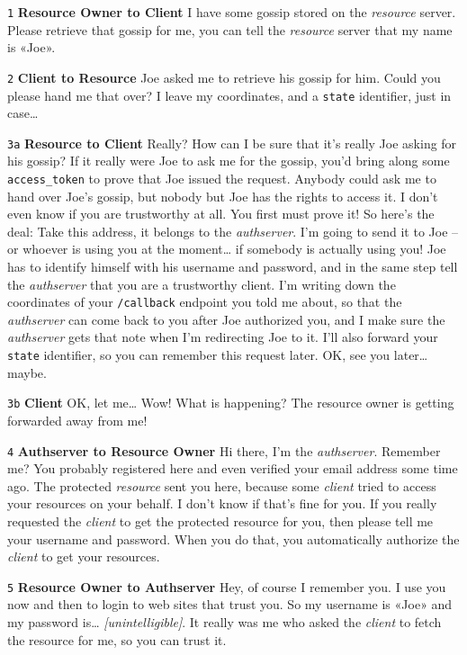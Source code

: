 \begin{description}
    \item \texttt{1} \textbf{Resource Owner to Client} I have some gossip stored on the \textit{resource} server. Please retrieve that gossip for me, you can tell the \textit{resource} server that my name is «Joe».
    \item \texttt{2} \textbf{Client to Resource} Joe asked me to retrieve his gossip for him. Could you please hand me that over? I leave my coordinates, and a \texttt{state} identifier, just in case…
    \item \texttt{3a} \textbf{Resource to Client} Really? How can I be sure that it's really Joe asking for his gossip? If it really were Joe to ask me for the gossip, you'd bring along some \texttt{access\_token} to prove that Joe issued the request. Anybody could ask me to hand over Joe's gossip, but nobody but Joe has the rights to access it. I don't even know if you are trustworthy at all. You first must prove it! So here's the deal: Take this address, it belongs to the \textit{authserver}. I'm going to send it to Joe -- or whoever is using you at the moment… if somebody is actually using you! Joe has to identify himself with his username and password, and in the same step tell the \textit{authserver} that you are a trustworthy client. I'm writing down the coordinates of your \texttt{/callback} endpoint you told me about, so that the \textit{authserver} can come back to you after Joe authorized you, and I make sure the \textit{authserver} gets that note when I'm redirecting Joe to it. I'll also forward your \texttt{state} identifier, so you can remember this request later. OK, see you later… maybe.
    \item \texttt{3b} \textbf{Client} OK, let me… Wow! What is happening? The resource owner is getting forwarded away from me!
    \item \texttt{4} \textbf{Authserver to Resource Owner} Hi there, I'm the \textit{authserver}. Remember me? You probably registered here and even verified your email address some time ago. The protected \textit{resource} sent you here, because some \textit{client} tried to access your resources on your behalf. I don't know if that's fine for you. If you really requested the \textit{client} to get the protected resource for you, then please tell me your username and password. When you do that, you automatically authorize the \textit{client} to get your resources.
    \item \texttt{5} \textbf{Resource Owner to Authserver} Hey, of course I remember you. I use you now and then to login to web sites that trust you. So my username is «Joe» and my password is… \textit{[unintelligible]}. It really was me who asked the \textit{client} to fetch the resource for me, so you can trust it.

\end{description}

